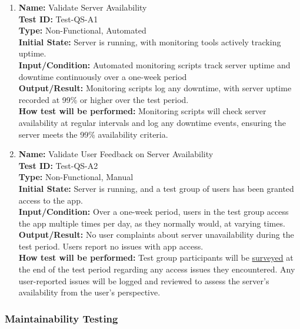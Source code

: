 \documentclass[12pt, titlepage]{article}
\begin{document}
\begin{enumerate}

  \item \textbf{Name:} Validate Server Availability \label{itm:Test-QS-A1} \\
        \textbf{Test ID:} Test-QS-A1 \\
        \textbf{Type:} Non-Functional, Automated \\
        \textbf{Initial State:} Server is running, with monitoring tools actively tracking uptime. \\
        \textbf{Input/Condition:} Automated monitoring scripts track server uptime and downtime continuously over a one-week period \\
        \textbf{Output/Result:} Monitoring scripts log any downtime, with server uptime recorded at 99\% or higher over the test period. \\
        \textbf{How test will be performed:} Monitoring scripts will check server availability at regular intervals and log any downtime events, ensuring the server meets the 99\% availability criteria.


  \item \textbf{Name:} Validate User Feedback on Server Availability \label{itm:Test-QS-A2} \\
        \textbf{Test ID:} Test-QS-A2 \\
        \textbf{Type:} Non-Functional, Manual \\
        \textbf{Initial State:} Server is running, and a test group of users has been granted access to the app. \\
        \textbf{Input/Condition:} Over a one-week period, users in the test group access the app multiple times per day, as they normally would, at varying times. \\
        \textbf{Output/Result:} No user complaints about server unavailability during the test period. Users report no issues with app access. \\
        \textbf{How test will be performed:} Test group participants will be \hyperref[sub:usability_survey]{surveyed} at the end of the test period regarding any access issues they encountered. Any user-reported issues will be logged and reviewed to assess the server's availability from the user's perspective.

\end{enumerate}
\subsubsection{Maintainability Testing}
\end{document}

